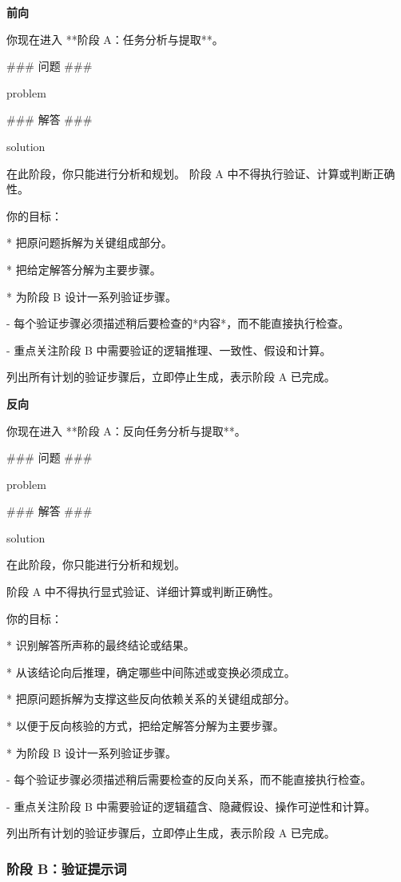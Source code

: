 \documentclass[11pt]{article}
\begin{document}
\textbf{前向}
\begin{promptbox}
你现在进入 **阶段 A：任务分析与提取**。

### 问题 ###

{problem}

### 解答 ###

{solution}

在此阶段，你只能进行分析和规划。
阶段 A 中不得执行验证、计算或判断正确性。

你的目标：

* 把原问题拆解为关键组成部分。

* 把给定解答分解为主要步骤。

* 为阶段 B 设计一系列验证步骤。

  - 每个验证步骤必须描述稍后要检查的*内容*，而不能直接执行检查。

  - 重点关注阶段 B 中需要验证的逻辑推理、一致性、假设和计算。

列出所有计划的验证步骤后，立即停止生成，表示阶段 A 已完成。
\end{promptbox}

\noindent\textbf{反向}
\begin{promptbox}
你现在进入 **阶段 A：反向任务分析与提取**。

### 问题 ###

{problem}

### 解答 ###

{solution}

在此阶段，你只能进行分析和规划。

阶段 A 中不得执行显式验证、详细计算或判断正确性。

你的目标：

* 识别解答所声称的最终结论或结果。

* 从该结论向后推理，确定哪些中间陈述或变换必须成立。

* 把原问题拆解为支撑这些反向依赖关系的关键组成部分。

* 以便于反向核验的方式，把给定解答分解为主要步骤。

* 为阶段 B 设计一系列验证步骤。

  - 每个验证步骤必须描述稍后需要检查的反向关系，而不能直接执行检查。
  
  - 重点关注阶段 B 中需要验证的逻辑蕴含、隐藏假设、操作可逆性和计算。

列出所有计划的验证步骤后，立即停止生成，表示阶段 A 已完成。
\end{promptbox}

\subsubsection{阶段 B：验证提示词}
\label{sec:appendix_steps_prompt}
\end{document}
